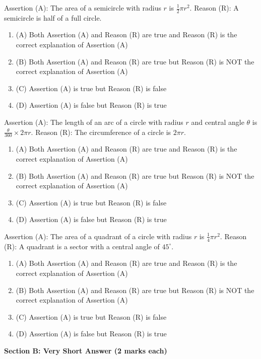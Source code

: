 \documentclass[12pt,a4paper]{exam}
\begin{document}
\begin{questions}
\question[1] Assertion (A): The area of a semicircle with radius $r$ is $\frac{1}{2} \pi r^2$. Reason (R): A semicircle is half of a full circle.
\begin{enumerate}[label=(\Alph*)]
  \item (A) Both Assertion (A) and Reason (R) are true and Reason (R) is the correct explanation of Assertion (A)
  \item (B) Both Assertion (A) and Reason (R) are true but Reason (R) is NOT the correct explanation of Assertion (A)
  \item (C) Assertion (A) is true but Reason (R) is false
  \item (D) Assertion (A) is false but Reason (R) is true
\end{enumerate}
\vspace{0.15cm}

\question[1] Assertion (A): The length of an arc of a circle with radius $r$ and central angle $\theta$ is $\frac{\theta}{360} \times 2\pi r$. Reason (R): The circumference of a circle is $2\pi r$.
\begin{enumerate}[label=(\Alph*)]
  \item (A) Both Assertion (A) and Reason (R) are true and Reason (R) is the correct explanation of Assertion (A)
  \item (B) Both Assertion (A) and Reason (R) are true but Reason (R) is NOT the correct explanation of Assertion (A)
  \item (C) Assertion (A) is true but Reason (R) is false
  \item (D) Assertion (A) is false but Reason (R) is true
\end{enumerate}
\vspace{0.15cm}

\question[1] Assertion (A): The area of a quadrant of a circle with radius $r$ is $\frac{1}{4} \pi r^2$. Reason (R): A quadrant is a sector with a central angle of $45^\circ$.
\begin{enumerate}[label=(\Alph*)]
  \item (A) Both Assertion (A) and Reason (R) are true and Reason (R) is the correct explanation of Assertion (A)
  \item (B) Both Assertion (A) and Reason (R) are true but Reason (R) is NOT the correct explanation of Assertion (A)
  \item (C) Assertion (A) is true but Reason (R) is false
  \item (D) Assertion (A) is false but Reason (R) is true
\end{enumerate}
\vspace{0.15cm}

\end{questions}
\bigskip
\noindent\textbf{\large Section B: Very Short Answer (2 marks each)}
\end{document}

